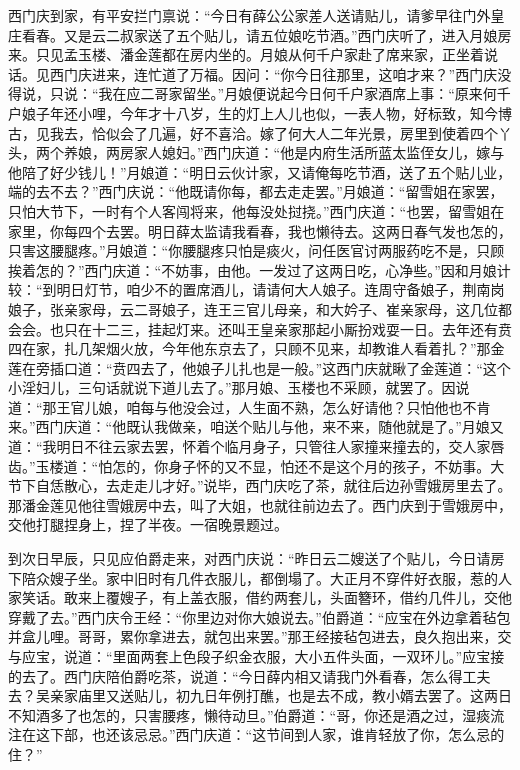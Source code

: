 西门庆到家，有平安拦门禀说：“今日有薛公公家差人送请贴儿，请爹早往门外皇庄看春。又是云二叔家送了五个贴儿，请五位娘吃节酒。”西门庆听了，进入月娘房来。只见孟玉楼、潘金莲都在房内坐的。月娘从何千户家赴了席来家，正坐着说话。见西门庆进来，连忙道了万福。因问：“你今日往那里，这咱才来？”西门庆没得说，只说：“我在应二哥家留坐。”月娘便说起今日何千户家酒席上事：“原来何千户娘子年还小哩，今年才十八岁，生的灯上人儿也似，一表人物，好标致，知今博古，见我去，恰似会了几遍，好不喜洽。嫁了何大人二年光景，房里到使着四个丫头，两个养娘，两房家人媳妇。”西门庆道：“他是内府生活所蓝太监侄女儿，嫁与他陪了好少钱儿！”月娘道：“明日云伙计家，又请俺每吃节酒，送了五个贴儿业，端的去不去？”西门庆说：“他既请你每，都去走走罢。”月娘道：“留雪姐在家罢，只怕大节下，一时有个人客闯将来，他每没处挝挠。”西门庆道：“也罢，留雪姐在家里，你每四个去罢。明日薛太监请我看春，我也懒待去。这两日春气发也怎的，只害这腰腿疼。”月娘道：“你腰腿疼只怕是痰火，问任医官讨两服药吃不是，只顾挨着怎的？”西门庆道：“不妨事，由他。一发过了这两日吃，心净些。”因和月娘计较：“到明日灯节，咱少不的置席酒儿，请请何大人娘子。连周守备娘子，荆南岗娘子，张亲家母，云二哥娘子，连王三官儿母亲，和大妗子、崔亲家母，这几位都会会。也只在十二三，挂起灯来。还叫王皇亲家那起小厮扮戏耍一日。去年还有贲四在家，扎几架烟火放，今年他东京去了，只顾不见来，却教谁人看着扎？”那金莲在旁插口道：“贲四去了，他娘子儿扎也是一般。”这西门庆就瞅了金莲道：“这个小淫妇儿，三句话就说下道儿去了。”那月娘、玉楼也不采顾，就罢了。因说道：“那王官儿娘，咱每与他没会过，人生面不熟，怎么好请他？只怕他也不肯来。”西门庆道：“他既认我做亲，咱送个贴儿与他，来不来，随他就是了。”月娘又道：“我明日不往云家去罢，怀着个临月身子，只管往人家撞来撞去的，交人家唇齿。”玉楼道：“怕怎的，你身子怀的又不显，怕还不是这个月的孩子，不妨事。大节下自恁散心，去走走儿才好。”说毕，西门庆吃了茶，就往后边孙雪娥房里去了。那潘金莲见他往雪娥房中去，叫了大姐，也就往前边去了。西门庆到于雪娥房中，交他打腿捏身上，捏了半夜。一宿晚景题过。

到次日早辰，只见应伯爵走来，对西门庆说：“昨日云二嫂送了个贴儿，今日请房下陪众嫂子坐。家中旧时有几件衣服儿，都倒塌了。大正月不穿件好衣服，惹的人家笑话。敢来上覆嫂子，有上盖衣服，借约两套儿，头面簪环，借约几件儿，交他穿戴了去。”西门庆令王经：“你里边对你大娘说去。”伯爵道：“应宝在外边拿着毡包并盒儿哩。哥哥，累你拿进去，就包出来罢。”那王经接毡包进去，良久抱出来，交与应宝，说道：“里面两套上色段子织金衣服，大小五件头面，一双环儿。”应宝接的去了。西门庆陪伯爵吃茶，说道：“今日薛内相又请我门外看春，怎么得工夫去？吴亲家庙里又送贴儿，初九日年例打醮，也是去不成，教小婿去罢了。这两日不知酒多了也怎的，只害腰疼，懒待动旦。”伯爵道：“哥，你还是酒之过，湿痰流注在这下部，也还该忌忌。”西门庆道：“这节间到人家，谁肯轻放了你，怎么忌的住？”

